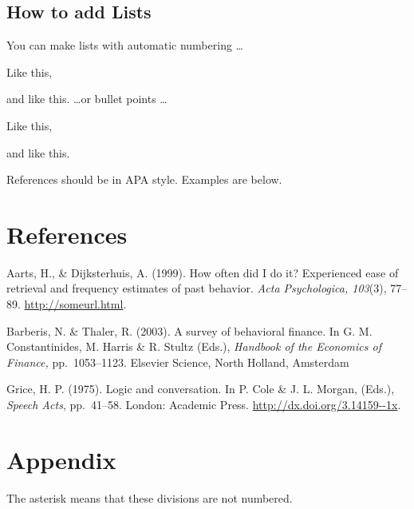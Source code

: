 \documentclass[12pt]{article}
\let\tempone\itemize
\let\temptwo\enditemize
\let\tempthree\enumerate
\let\tempfour\endenumerate
\renewenvironment{itemize}{\tempone\setlength{\itemsep}{0pt}}{\temptwo}
\renewenvironment{enumerate}{\tempthree\setlength{\itemsep}{0pt}}{\tempfour}
\begin{document}
\subsection{How to add Lists}

You can make lists with automatic numbering \dots

\begin{enumerate}
\item Like this,
\item and like this.
\end{enumerate}
\dots or bullet points \dots
\begin{itemize}
\item Like this,
\item and like this.
\end{itemize}

References should be in APA style. Examples are below.

%
%
\section*{References}

\begin{hangparas}{1em}{1}

  Aarts, H., \& Dijksterhuis, A. (1999).  How often did I do it?
  Experienced ease of retrieval and frequency estimates of past
  behavior.  \textit{Acta Psychologica, 103}(3), 77--89. \url{http://someurl.html}.

  Barberis, N. \& Thaler, R. (2003). A survey of behavioral finance.
  In G. M. Constantinides, M. Harris \& R. Stultz (Eds.),
  \textit{Handbook of the Economics of Finance,} pp.\ 1053--1123.
  Elsevier Science, North Holland, Amsterdam

\vfill %
\break

Grice, H. P. (1975).  Logic and conversation. In P. Cole \& J.
L. Morgan, (Eds.), \textit{Speech Acts}, pp.\ 41--58. London: Academic
Press. \url{http://dx.doi.org/3.14159--1x}.
\end{hangparas}

\bigskip
\section*{Appendix}

The asterisk means that these divisions are not numbered.
\end{document}
